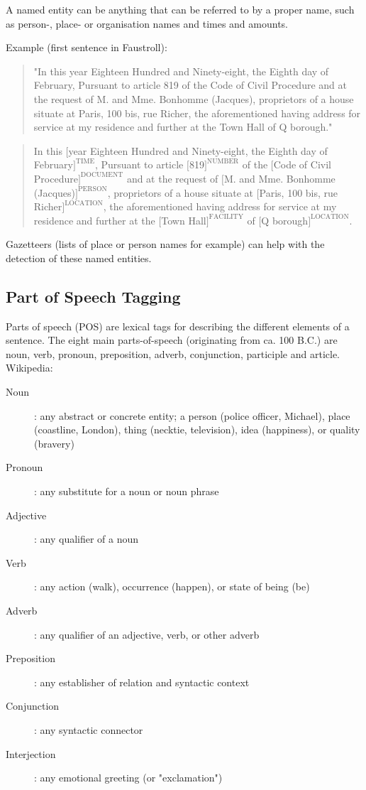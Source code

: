 A named entity can be anything that can be referred to by a proper name, such as person-, place- or organisation names and times and amounts.

Example (first sentence in Faustroll):

\begin{quote}
  "In this year Eighteen Hundred and Ninety-eight, the Eighth day of February, Pursuant to article 819 of the Code of Civil Procedure and at the request of M. and Mme. Bonhomme (Jacques), proprietors of a house situate at Paris, 100 bis, rue Richer, the aforementioned having address for service at my residence and further at the Town Hall of Q borough."
\end{quote}

\begin{quote}
  In this $[$year Eighteen Hundred and Ninety-eight, the Eighth day of February$]^{\text{TIME}}$, Pursuant to article $[$819$]^{\text{NUMBER}}$ of the $[$Code of Civil Procedure$]^{\text{DOCUMENT}}$ and at the request of $[$M. and Mme. Bonhomme (Jacques)$]^{\text{PERSON}}$, proprietors of a house situate at $[$Paris, 100 bis, rue Richer$]^{\text{LOCATION}}$, the aforementioned having address for service at my residence and further at the $[$Town Hall$]^{\text{FACILITY}}$ of $[$Q borough$]^{\text{LOCATION}}$.
\end{quote}

Gazetteers (lists of place or person names for example) can help with the detection of these named entities.


\subsection*{Part of Speech Tagging}

Parts of speech (POS) are lexical tags for describing the different elements of a sentence. The eight main parts-of-speech (originating from ca. 100 B.C.) are noun, verb, pronoun, preposition, adverb, conjunction, participle and article.
Wikipedia:

\begin{description}
  \item [Noun]: any abstract or concrete entity; a person (police officer, Michael), place (coastline, London), thing (necktie, television), idea (happiness), or quality (bravery)
  \item [Pronoun]: any substitute for a noun or noun phrase
  \item [Adjective]: any qualifier of a noun
  \item [Verb]: any action (walk), occurrence (happen), or state of being (be)
  \item [Adverb]: any qualifier of an adjective, verb, or other adverb
  \item [Preposition]: any establisher of relation and syntactic context
  \item [Conjunction]: any syntactic connector
  \item [Interjection]: any emotional greeting (or "exclamation")
\end{description}

